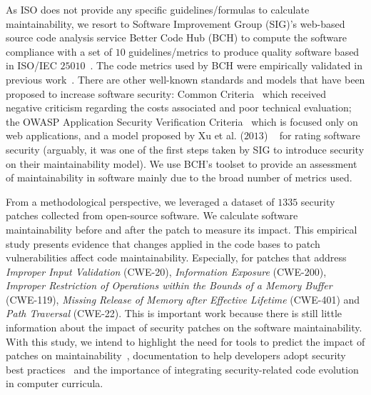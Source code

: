 \documentclass[10pt,conference]{IEEEtran}
\begin{document}
As ISO does not provide any specific guidelines/formulas to calculate 
maintainability, we resort to Software Improvement Group (SIG)'s web-based source 
code analysis service Better Code Hub (BCH) to compute the software compliance 
with a set of $10$ guidelines/metrics to produce quality software 
based in ISO/IEC $25010$~\cite{Visser:2016:OREILLY}. The code metrics used by BCH 
were empirically validated in previous work~\cite{Bijlsma:2012:FIR:2317098.2317124, 8530041, cruz2019energyoriented}. 
There are other well-known standards and models that have been proposed
to increase software security: Common Criteria~\cite{common:2009} which received
negative criticism regarding the costs associated and poor technical evaluation;
the OWASP Application Security Verification Criteria~\cite{oswap:2009} which is
focused only on web applications, and a model proposed by Xu et al. ($2013$)
~\cite{6616351} for rating software security (arguably, it was one of the
first steps taken by SIG to introduce security on their maintainability model). 
%
We use BCH's toolset to provide an assessment of maintainability in 
software mainly due to the broad number of metrics used.

From a methodological 
perspective, we leveraged a dataset of $1335$ security patches collected from open-source 
software. We calculate software maintainability before and after the patch to measure its 
impact. This empirical study presents evidence that changes 
applied in the code bases to patch vulnerabilities affect code maintainability. Especially, for patches that address \emph{Improper Input Validation} (CWE-20), \emph{Information 
Exposure} (CWE-200), \emph{Improper Restriction of Operations within the Bounds of a 
Memory Buffer} (CWE-119), \emph{Missing Release of Memory after Effective Lifetime} 
(CWE-401) and \emph{Path Traversal} (CWE-22). This is important work
because there is still little information about the impact of security patches on the software
maintainability. With this study, 
we intend to highlight the need for tools to predict the impact of patches on 
maintainability~\cite{4724577}, documentation to help developers adopt security 
best practices~\cite{6311252, 7927935, MESQUIDA201519} and the importance of integrating
security-related code evolution in computer curricula.
%
%
\end{document}
